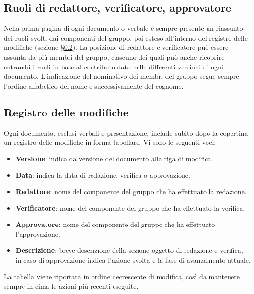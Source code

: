 \subsection{Ruoli di redattore, verificatore, approvatore}
Nella prima pagina di ogni documento o verbale è sempre presente un riassunto dei ruoli svolti dai componenti del gruppo, poi esteso all'interno del registro delle modifiche (sezione \S\ref{documentazione_registromodifiche}).
La posizione di redattore e verificatore può essere assunta da più membri del gruppo, ciascuno dei quali può anche ricoprire entrambi i ruoli in base al contributo dato nelle differenti versioni di ogni documento.
L'indicazione del nominativo dei membri del gruppo segue sempre l'ordine alfabetico del nome e successivamente del cognome.

\subsection{Registro delle modifiche}
\label{documentazione_registromodifiche}
Ogni documento, esclusi verbali e presentazione, include subito dopo la copertina un registro delle modifiche in forma tabellare.
Vi sono le seguenti voci:
\begin{itemize}
    \item \textbf{Versione}: indica da versione del documento alla riga di modifica.
    \item \textbf{Data}: indica la data di redazione, verifica o approvazione.
    \item \textbf{Redattore}: nome del componente del gruppo che ha effettuato la redazione.
    \item \textbf{Verificatore}: nome del componente del gruppo che ha effettuato la verifica.
    \item \textbf{Approvatore}: nome del componente del gruppo che ha effettuato l'approvazione.
    \item \textbf{Descrizione}: breve descrizione della sezione oggetto di redazione e verifica, in caso di approvazione indica l'azione svolta e la fase di avanzamento attuale.
\end{itemize}
\noindent
La tabella viene riportata in ordine decrescente di modifica, così da mantenere sempre in cima le azioni più recenti eseguite.

